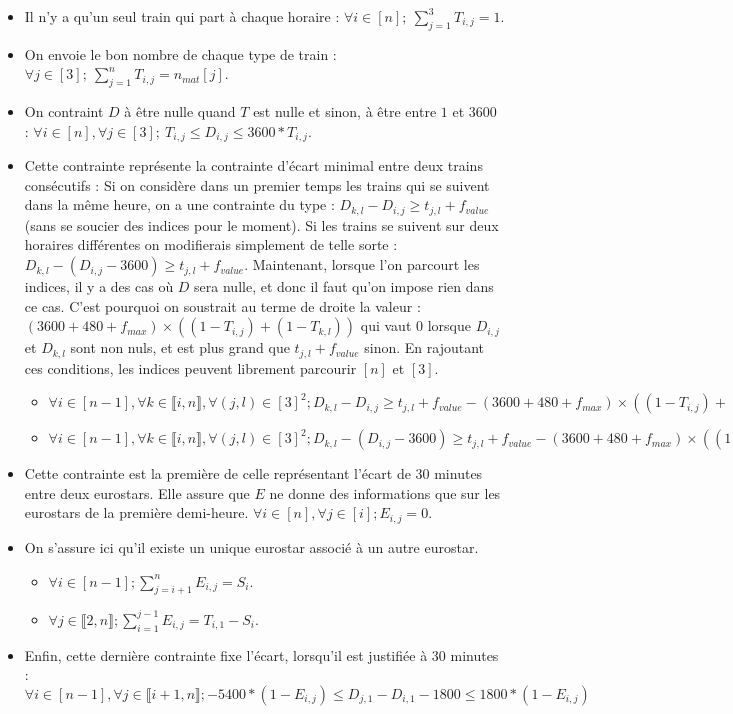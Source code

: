 \documentclass{rapport}
\begin{document}
\begin{itemize}
	\item Il n'y a qu'un seul train qui part à chaque horaire : $\forall i \in [n]; \ \sum_{j = 1}^3 T_{i, j} = 1$.
	\item On envoie le bon nombre de chaque type de train : $\forall j \in [3]; \ \sum_{j = 1}^n T_{i, j} = n_{mat}[j]$.
	\item On contraint $D$ à être nulle quand $T$ est nulle et sinon, à être entre $1$ et $3600$ : $\forall i \in [n], \forall j \in [3]; \ T_{i, j} \le D_{i, j} \le 3600 * T_{i, j}$.
	\item Cette contrainte représente la contrainte d'écart minimal entre deux trains consécutifs : 
	Si on considère dans un premier temps les trains qui se suivent dans la même heure, on a une contrainte du type : $D_{k, l} - D_{i, j} \ge t_{j, l} + f_{value}$ (sans se soucier des indices pour le moment). Si les trains se suivent sur deux horaires différentes on modifierais simplement de telle sorte : $D_{k, l} - (D_{i, j} - 3600) \ge t_{j, l} + f_{value}$. Maintenant, lorsque l'on parcourt les indices, il y a des cas où $D$ sera nulle, et donc il faut qu'on impose rien dans ce cas. C'est pourquoi on soustrait au terme de droite la valeur : $(3600 + 480 + f_{max}) \times ((1 - T_{i, j}) + (1 - T_{k, l}))$ qui vaut 0 lorsque $D_{i, j}$ et $D_{k, l}$ sont non nuls, et est plus grand que $t_{j, l} + f_{value}$ sinon. En rajoutant ces conditions, les indices peuvent librement parcourir $[n]$ et $[3]$.
	\begin{itemize}
		\item $\forall i \in [n-1], \forall k \in \llbracket i, n \rrbracket, \forall (j, l) \in [3]^2; D_{k, l} - D_{i, j} \ge t_{j, l} + f_{value} - (3600 + 480 + f_{max}) \times ((1 - T_{i, j}) + (1 - T_{k, l}))$
		\item $\forall i \in [n-1], \forall k \in \llbracket i, n \rrbracket, \forall (j, l) \in [3]^2; D_{k, l} - (D_{i, j} - 3600) \ge t_{j, l} + f_{value} - (3600 + 480 + f_{max}) \times ((1 - T_{i, j}) + (1 - T_{k, l}))$
	\end{itemize}
	\item Cette contrainte est la première de celle représentant l'écart de 30 minutes entre deux eurostars. Elle assure que $E$ ne donne des informations que sur les eurostars de la première demi-heure. $\forall i \in [n], \forall j \in [i]; E_{i, j} = 0$.
	\item On s'assure ici qu'il existe un unique eurostar associé à un autre eurostar.
	\begin{itemize}
		\item $\forall i \in [n-1]; \sum_{j = i+1}^n E_{i, j} = S_i$.
		\item $\forall j \in \llbracket 2, n \rrbracket; \sum_{i = 1}^{j-1} E_{i, j} = T_{i, 1} - S_i$.
	\end{itemize}
	\item Enfin, cette dernière contrainte fixe l'écart, lorsqu'il est justifiée à 30 minutes : $\forall i \in [n-1], \forall j \in \llbracket i+1, n \rrbracket; - 5400 * (1 - E_{i, j})  \le D_{j, 1} - D_{i, 1} - 1800 \le 1800 * (1 - E_{i, j})$

\end{itemize}
\end{document}
